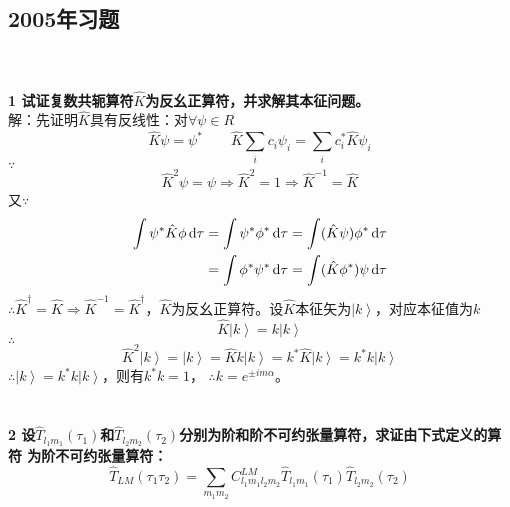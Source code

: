 \documentclass[12pt]{article}
\numberwithin{equation}{section}	 %
\begin{document}
\begin{spacing}{1.5}
\subsection{2005年习题}
~\\
~\\
\textbf{1 \quad 试证复数共轭算符$\hat{K}$为反幺正算符，并求解其本征问题。}\\
解：先证明$\hat{K}$具有反线性：对$\forall\psi \in R$\\
\begin{equation}
\hat{K}\psi = \psi^{*} \qquad \hat{K}\sum_{i}c_{i}\psi_{i} = \sum_{i}c^{*}_{i}\hat{K}\psi_{i}
\end{equation}
$\because$
\begin{equation}
\hat{K}^{2}\psi = \psi \Rightarrow \hat{K}^{2}=1 \Rightarrow \hat{K}^{-1}=\hat{K}
\end{equation}
又$\because$
\begin{equation}
\begin{aligned}
\int\psi^{*}\hat{K}\phi\mathop{}\!\mathrm{d}\tau &= \int\psi^{*}\phi^{*}\mathop{}\!\mathrm{d}\tau = \int(\hat{K}\psi)\phi^{*}\mathop{}\!\mathrm{d}\tau \\
&= \int\phi^{*}\psi^{*}\mathop{}\!\mathrm{d}\tau = \int(\hat{K}\phi^{*})\psi\mathop{}\!\mathrm{d}\tau
\end{aligned}
\end{equation}
$\therefore \hat{K}^{\dagger}=\hat{K} \Rightarrow \hat{K}^{-1}=\hat{K}^{\dagger}$，$\hat{K}$为反幺正算符。设$\hat{K}$本征矢为$\left|k\right>$，对应本征值为$k$
\begin{equation}
\hat{K}\left|k\right> = k\left|k\right>
\end{equation}
$\therefore$
\begin{equation}
\hat{K}^{2}\left|k\right> = \left|k\right> = \hat{K}k\left|k\right> = k^{*}\hat{K}\left|k\right> = k^{*}k\left|k\right>
\end{equation}
$\therefore \left|k\right> = k^{*}k\left|k\right>$，则有$k^{*}k=1$，
$\therefore k=e^{\pm im\alpha}$。\\
~\\
~\\
\textbf{2 \quad 设$\hat{T}_{l_{1}m_{1}}(\tau_{1})$和$\hat{T}_{l_{2}m_{2}}(\tau_{2})$分别为阶和阶不可约张量算符，求证由下式定义的算符
为阶不可约张量算符：
\begin{equation}\nonumber 		%
\hat{T}_{LM}(\tau_{1}\tau_{2}) = \sum_{m_{1}m_{2}}C_{l_{1}m_{1}l_{2}m_{2}}^{LM}\hat{T}_{l_{1}m_{1}}(\tau_{1})\hat{T}_{l_{2}m_{2}}(\tau_{2})
\end{equation}}\\

\end{spacing}
\end{document}
